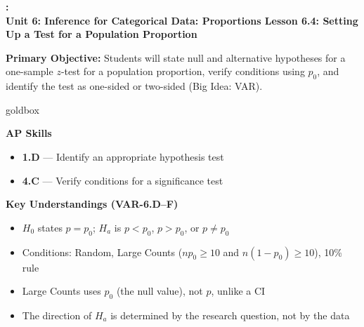 \documentclass[10pt]{article}
\newcommand{\UnitNumberName}{Unit 6: Inference for Categorical Data: Proportions \quad}
\newcommand{\LessonNumberName}{Lesson 6.4: Setting Up a Test for a Population Proportion}
\begin{document}
\begin{center}
    {\Large\bfseries \CourseName: \SchoolYear \\
    {\small\bfseries \UnitNumberName \LessonNumberName}}
\end{center}

\begin{tcolorbox}[colback=sky, colframe=navy, boxrule=0.9pt, arc=2mm,
    left=2mm, right=2mm, top=1.5mm, bottom=1.5mm]
    \textbf{Primary Objective:} Students will state null and alternative hypotheses for a
    one-sample $z$-test for a population proportion, verify conditions using $p_0$, and
    identify the test as one-sided or two-sided (Big Idea: VAR).
\end{tcolorbox}

\renewcommand{\arraystretch}{1.6}
\begin{skillbox}{goldbox}
    \begin{minipage}[t]{0.48\linewidth}\vspace{0pt}
        \textbf{AP Skills}
        \begin{itemize}[leftmargin=1.2em]
            \item \textbf{1.D} --- Identify an appropriate hypothesis test
            \item \textbf{4.C} --- Verify conditions for a significance test
        \end{itemize}
    \end{minipage}\hfill
    \begin{minipage}[t]{0.48\linewidth}\vspace{0pt}
        \textbf{Key Understandings (VAR-6.D--F)}
        \begin{itemize}[leftmargin=1.2em]
            \item $H_0$ states $p = p_0$; $H_a$ is $p < p_0$, $p > p_0$, or $p \ne p_0$
            \item Conditions: Random, Large Counts ($np_0 \ge 10$ and $n(1-p_0) \ge 10$), 10\% rule
            \item Large Counts uses $p_0$ (the null value), not $\hat p$, unlike a CI
            \item The direction of $H_a$ is determined by the research question, not by the data
        \end{itemize}
    \end{minipage}
\end{skillbox}
\end{document}
